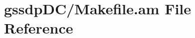 \hypertarget{gssdp_d_c_2_makefile_8am}{}\section{gssdp\+D\+C/\+Makefile.am File Reference}
\label{gssdp_d_c_2_makefile_8am}
